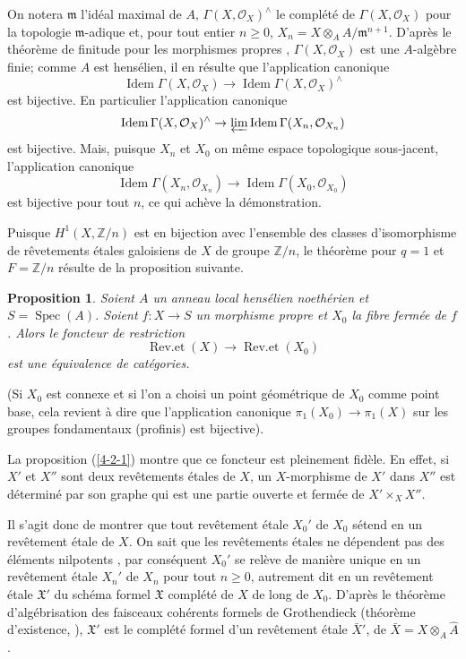 \documentclass{article}
\DeclareMathOperator{\spec}{Spec}
\newcommand{\cO}{\mathcal{O}}
\newcommand{\dZ}{\mathbb{Z}}
\newcommand{\fm}{\mathfrak{m}}
\newcommand{\fX}{\mathfrak{X}}
\newtheorem{proposition}[subsubsection]{Proposition}
\begin{document}
On notera $\fm$ l'id\'eal maximal de $A$, $\Gamma(X,\cO_X)^\wedge$ le complété 
de $\Gamma(X,\cO_X)$ pour la topologie $\fm$-adique et, pour tout entier 
$n\geqslant 0$, $X_n=X\otimes_A A/\fm^{n+1}$. D'apr\`es le théorème de finitude 
pour les morphismes propres \cite[III.3.2]{8}, $\Gamma(X,\cO_X)$ est une 
$A$-alg\`ebre finie; comme $A$ est hens\'elien, il en r\'esulte que 
l'application canonique 
\[
  \operatorname{Idem} \Gamma(X,\cO_X) \to \operatorname{Idem}\Gamma(X,\cO_X)^\wedge
\]
est bijective. En particulier l'application canonique 
\[
  \operatorname{Idem} \Gamma(X,\cO_X)^\wedge \to \varprojlim \operatorname{Idem}\Gamma(X_n,\cO_{X_n})
\]
est bijective. Mais, puisque $X_n$ et $X_0$ on m\^eme espace topologique 
sous-jacent, l'application canonique 
\[
  \operatorname{Idem}\Gamma(X_n,\cO_{X_n}) \to \operatorname{Idem} \Gamma(X_0,\cO_{X_0})
\]
est bijective pour tout $n$, ce qui ach\`eve la d\'emonstration. 

Puisque $H^1(X,\dZ/n)$ est en bijection avec l'ensemble des classes 
d'isomorphisme de r\^evetements \'etales galoisiens de $X$ de groupe $\dZ/n$, 
le théorème  pour $q=1$ et $F=\dZ/n$ r\'esulte de la proposition suivante. 





\begin{proposition}\label{4-2-2}
Soient $A$ un anneau local hens\'elien noeth\'erien et $S=\spec(A)$. Soient 
$f:X\to S$ un morphisme propre et $X_0$ la fibre ferm\'ee de $f$. Alors le 
foncteur de restriction 
\[
  \operatorname{Rev.et}(X) \to \operatorname{Rev.et}(X_0)
\]
est une \'equivalence de cat\'egories. 
\end{proposition}

(Si $X_0$ est connexe et si l'on a choisi un point g\'eom\'etrique de $X_0$ 
comme point base, cela revient \`a dire que l'application canonique 
$\pi_1(X_0)\to \pi_1(X)$ sur les groupes fondamentaux (profinis) est 
bijective). 

La proposition (\ref{4-2-1}) montre que ce foncteur est pleinement fid\`ele. En 
effet, si $X'$ et $X''$ sont deux revêtements \'etales de $X$, un 
$X$-morphisme de $X'$ dans $X''$ est d\'etermin\'e par son graphe qui est une 
partie ouverte et ferm\'ee de $X'\times_X X''$. 

Il s'agit donc de montrer que tout revêtement \'etale $X_0'$ de $X_0$ s\'etend 
en un revêtement \'etale de $X$. On sait que les revêtements \'etales ne 
d\'ependent pas des \'el\'ements nilpotents \cite[chap. 1]{7}, par cons\'equent 
$X_0'$ se rel\`eve de mani\`ere unique en un revêtement \'etale $X_n'$ de 
$X_n$ pour tout $n\geqslant 0$, autrement dit en un revêtement \'etale 
$\fX'$ du sch\'ema formel $\fX$ compl\'et\'e de $X$ de long de $X_0$. D'apr\`es 
le théorème d'alg\'ebrisation des faisceaux coh\'erents formels de 
Grothendieck (théorème d'existence, \cite[III.5]{8}), $\fX'$ est le 
compl\'et\'e formel d'un revêtement \'etale $\bar X'$, de 
$\bar X=X\otimes_A \hat A$. 
\end{document}
